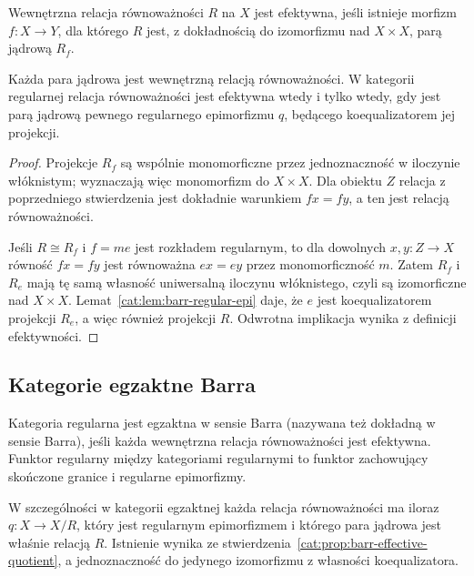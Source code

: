 \begin{definicja}\label{cat:def:barr-effective}
Wewnętrzna relacja równoważności $R$ na $X$ jest efektywna, jeśli istnieje morfizm $f:X\to Y$, dla którego $R$ jest, z dokładnością do izomorfizmu nad $X\times X$, parą jądrową $R_f$.
\end{definicja}

\begin{stwierdzenie}\label{cat:prop:barr-effective-quotient}
Każda para jądrowa jest wewnętrzną relacją równoważności. W kategorii regularnej relacja równoważności jest efektywna wtedy i tylko wtedy, gdy jest parą jądrową pewnego regularnego epimorfizmu $q$, będącego koequalizatorem jej projekcji.
\end{stwierdzenie}
\begin{proof}
Projekcje $R_f$ są wspólnie monomorficzne przez jednoznaczność w iloczynie włóknistym; wyznaczają więc monomorfizm do $X\times X$. Dla obiektu $Z$ relacja z poprzedniego stwierdzenia jest dokładnie warunkiem $fx=fy$, a ten jest relacją równoważności. 

Jeśli $R\cong R_f$ i $f=me$ jest rozkładem regularnym, to dla dowolnych $x,y:Z\to X$ równość $fx=fy$ jest równoważna $ex=ey$ przez monomorficzność $m$. Zatem $R_f$ i $R_e$ mają tę samą własność uniwersalną iloczynu włóknistego, czyli są izomorficzne nad $X\times X$. Lemat~\ref{cat:lem:barr-regular-epi} daje, że $e$ jest koequalizatorem projekcji $R_e$, a więc również projekcji $R$. Odwrotna implikacja wynika z definicji efektywności.
\end{proof}

\subsection{Kategorie egzaktne Barra}

\begin{definicja}\label{cat:def:barr-exact}
Kategoria regularna jest egzaktna w sensie Barra (nazywana też dokładną w sensie Barra), jeśli każda wewnętrzna relacja równoważności jest efektywna. Funktor regularny między kategoriami regularnymi to funktor zachowujący skończone granice i regularne epimorfizmy.
\end{definicja}

W szczególności w kategorii egzaktnej każda relacja równoważności ma iloraz $q:X\to X/R$, który jest regularnym epimorfizmem i którego para jądrowa jest właśnie relacją $R$. Istnienie wynika ze stwierdzenia~\ref{cat:prop:barr-effective-quotient}, a jednoznaczność do jedynego izomorfizmu z własności koequalizatora.

